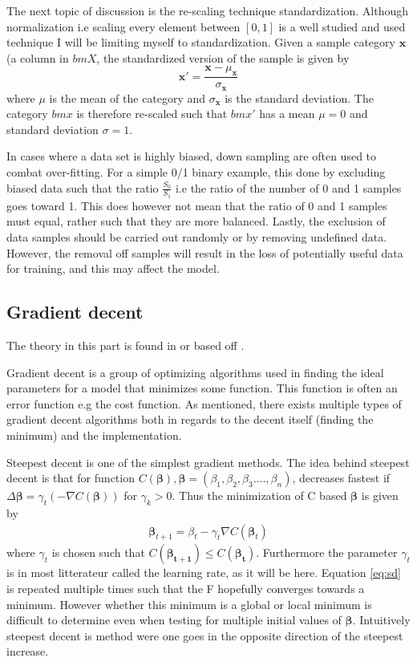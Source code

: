 \documentclass[uio,jmp,amsmath,amssymb,reprint,nofootinbib]{revtex4-1}
\numberwithin{equation}{section}
\newcommand{\lp}{\left(}
\newcommand{\rp}{\right)}
\begin{document}
The next topic of discussion is the re-scaling technique standardization. Although normalization i.e scaling every element between \([0,1]\) is a well studied and used technique I will be limiting myself to standardization. Given a sample category \(\bm{x}\) (a column in \(bm{X}\), the standardized version of the sample is given by
\begin{equation}\label{eq:02}
\bm{x}' = \frac{\bm{x} - \mu_{\bm{x}}}{\sigma_{\bm{x}}} 
\end{equation}
where \(\mu\) is the mean of the category and \(\sigma_{\bm{x}}\) is the standard deviation. The category \(bm{x}\) is therefore re-scaled such that \(bm{x}'\) has a mean \(\mu = 0\) and standard deviation \(\sigma = 1\).

In cases where a data set is highly biased, down sampling are often used to combat over-fitting. For a simple 0/1 binary example, this done by excluding biased data such that the ratio \(\frac{S_0}{S_1}\) i.e the ratio of the number of 0 and 1 samples goes toward 1. This does however not mean that the ratio of 0 and 1 samples must equal, rather such that they are more balanced. Lastly, the exclusion of data samples should be carried out randomly or by removing undefined data. However, the removal off samples will result in the loss of potentially useful data for training, and this may affect the model.

\subsection{Gradient decent}\label{sec:gd}

The theory in this part is found in or based off \cite{MHJ_GD}.

Gradient decent is a group of optimizing algorithms used in finding the ideal parameters for a model that minimizes some function. This function is often an error function e.g the cost function. As mentioned, there exists multiple types of gradient decent algorithms both in regards to the decent itself (finding the minimum) and the implementation.

Steepest decent is one of the simplest gradient methods. The idea behind steepest decent is that for function \(C(\bm{\beta}), \bm{\beta} = (\beta_1, \beta_2, \beta_3 ...., \beta_n)\), decreases fastest if \(\Delta \bm{\beta} = \gamma_t\lp -\nabla C(\bm{\beta})\rp\) for \(\gamma_k > 0\). Thus the minimization of C based \(\bm{\beta}\) is given by
\begin{align}\label{eq:sd}
\bm{\beta}_{t+1} = \beta_t - \gamma_t\nabla C(\bm{\beta}_t)
\end{align}
where \(\gamma_t\) is chosen such that \(C(\bm{\beta_{t+1}}) \leq C(\bm{\beta_{t}})\). Furthermore the parameter \(\gamma_t\) is in most litterateur called the learning rate, as it will be here. Equation \ref{eq:sd} is repeated multiple times such that the F hopefully converges towards a minimum. However whether this minimum is a global or local minimum is difficult to determine even when testing for multiple initial values of \(\bm{\beta}\). Intuitively steepest decent is method were one goes in the opposite direction of the steepest increase.
\end{document}
